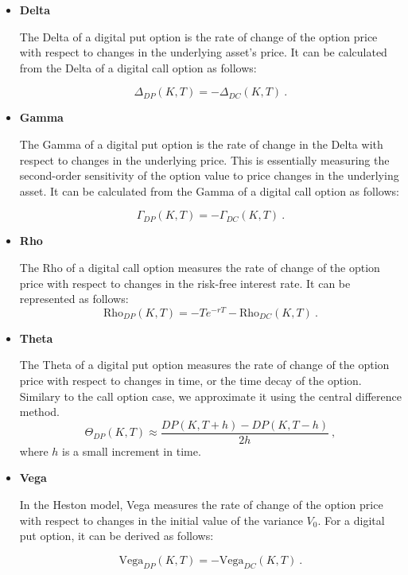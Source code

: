 \begin{itemize}

\item \textbf{Delta} 

The Delta of a digital put option is the rate of change of the option price with respect to changes in the underlying asset's price. It can be calculated from the Delta of a digital call option as follows:

$$
\Delta_{DP}(K,T) = -\Delta_{DC}(K,T) \ .
$$

\item \textbf{Gamma} 

The Gamma of a digital put option is the rate of change in the Delta with respect to changes in the underlying price. This is essentially measuring the second-order sensitivity of the option value to price changes in the underlying asset. It can be calculated from the Gamma of a digital call option as follows:

$$
\Gamma_{DP}(K,T) = -\Gamma_{DC}(K,T) \ .
$$



\item \textbf{Rho} 

The Rho of a digital call option measures the rate of change of the option price with respect to changes in the risk-free interest rate. It can be represented as follows:
$$
\text{Rho}_{DP}(K,T) = 
-Te^{-rT} - \text{Rho}_{DC}(K,T) \ .
$$


\item \textbf{Theta} 

The Theta of a digital put option measures the rate of change of the option price with respect to changes in time, or the time decay of the option. Similary to the call option case, we approximate it using the central difference method. 
$$
 \Theta_{DP}(K,T) \approx \frac{DP(K,T+h) - DP(K,T-h)}{2h} \ ,
$$
where $h$ is a small increment in time. 

\item \textbf{Vega} 

In the Heston model, Vega measures the rate of change of the option price with respect to changes in the initial value of the variance $V_0$. For a digital put option, it can be derived as follows:

$$
\text{Vega}_{DP}(K,T) = - \text{Vega}_{DC}(K,T) \ .
$$






\end{itemize}







